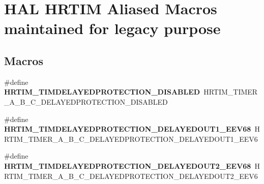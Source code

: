 \hypertarget{group___h_a_l___h_r_t_i_m___aliased___macros}{}\section{H\+AL H\+R\+T\+IM Aliased Macros maintained for legacy purpose}
\label{group___h_a_l___h_r_t_i_m___aliased___macros}
\subsection*{Macros}
\begin{DoxyCompactItemize}
\item 
\mbox{\label{group___h_a_l___h_r_t_i_m___aliased___macros_gaf8ea73c0eb91b7d7da248b14d6f82710}} 
\#define {\bfseries H\+R\+T\+I\+M\+\_\+\+T\+I\+M\+D\+E\+L\+A\+Y\+E\+D\+P\+R\+O\+T\+E\+C\+T\+I\+O\+N\+\_\+\+D\+I\+S\+A\+B\+L\+ED}~H\+R\+T\+I\+M\+\_\+\+T\+I\+M\+E\+R\+\_\+\+A\+\_\+\+B\+\_\+\+C\+\_\+\+D\+E\+L\+A\+Y\+E\+D\+P\+R\+O\+T\+E\+C\+T\+I\+O\+N\+\_\+\+D\+I\+S\+A\+B\+L\+ED
\item 
\mbox{\label{group___h_a_l___h_r_t_i_m___aliased___macros_ga0ccedae4619a41d435a4c1913496a2c4}} 
\#define {\bfseries H\+R\+T\+I\+M\+\_\+\+T\+I\+M\+D\+E\+L\+A\+Y\+E\+D\+P\+R\+O\+T\+E\+C\+T\+I\+O\+N\+\_\+\+D\+E\+L\+A\+Y\+E\+D\+O\+U\+T1\+\_\+\+E\+E\+V68}~H\+R\+T\+I\+M\+\_\+\+T\+I\+M\+E\+R\+\_\+\+A\+\_\+\+B\+\_\+\+C\+\_\+\+D\+E\+L\+A\+Y\+E\+D\+P\+R\+O\+T\+E\+C\+T\+I\+O\+N\+\_\+\+D\+E\+L\+A\+Y\+E\+D\+O\+U\+T1\+\_\+\+E\+E\+V6
\item 
\mbox{\label{group___h_a_l___h_r_t_i_m___aliased___macros_ga15dc628c952535647b1c510f046fb635}} 
\#define {\bfseries H\+R\+T\+I\+M\+\_\+\+T\+I\+M\+D\+E\+L\+A\+Y\+E\+D\+P\+R\+O\+T\+E\+C\+T\+I\+O\+N\+\_\+\+D\+E\+L\+A\+Y\+E\+D\+O\+U\+T2\+\_\+\+E\+E\+V68}~H\+R\+T\+I\+M\+\_\+\+T\+I\+M\+E\+R\+\_\+\+A\+\_\+\+B\+\_\+\+C\+\_\+\+D\+E\+L\+A\+Y\+E\+D\+P\+R\+O\+T\+E\+C\+T\+I\+O\+N\+\_\+\+D\+E\+L\+A\+Y\+E\+D\+O\+U\+T2\+\_\+\+E\+E\+V6
\item 
\mbox{\label{group___h_a_l___h_r_t_i_m___aliased___macros_ga2bc2fb991e73a9ef622d0de1933079e5}} 

\end{DoxyCompactItemize}
